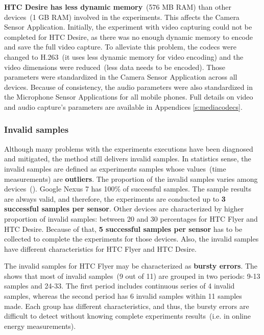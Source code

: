 \textbf{HTC Desire has less dynamic memory}\ (576 MB RAM) than other devices\ (1 GB RAM) involved in the experiments. This affects the Camera Sensor Application. Initially, the experiment with video capturing could not be completed for HTC Desire, as there was no enough dynamic memory to encode and save the full video capture.  To alleviate this problem, the codecs were changed to H.263\ (it uses less dynamic memory for video encoding) and the video dimensions were reduced\ (less data needs to be encoded). Those parameters were standardized in the Camera Sensor Application across all devices. Because of consistency, the audio parameters were also standardized in the Microphone Sensor Applications for all mobile phones. Full details on video and audio capture's parameters are available in Appendices \ref{s:mediacodecs}.
			
\subsubsection{Invalid samples}
\hspace{10pt} Although many problems with the experiments executions have been diagnosed and mitigated, the method still delivers invalid samples. In statistics sense, the invalid samples are defined as experiments samples whose values\ (time measurements) are \textbf{outliers}.  The proportion of the invalid samples varies among devices\ (). Google Nexus 7 has 100\% of successful samples. The sample results are always valid, and therefore, the experiments are conducted up to \textbf{3 successful samples per sensor}. Other devices are characterized by higher proportion of invalid samples: between 20 and 30 percentages for HTC Flyer and HTC Desire. Because of that, \textbf{5 successful samples per sensor} has to be collected to complete the experiments for those devices. Also, the invalid samples have different characteristics for HTC Flyer and HTC Desire. 

	
The invalid samples for HTC Flyer may be characterized as \textbf{bursty errors}. The  shows that most of invalid samples\ (9 out of 11) are grouped in two periods: 9-13 samples and 24-33. The first period includes continuous series of 4 invalid samples, whereas the second period has 6 invalid samples within 11 samples made. Each group has different characteristics, and thus, the bursty errors are difficult to detect without knowing complete experiments results\ (i.e. in online energy measurements).

